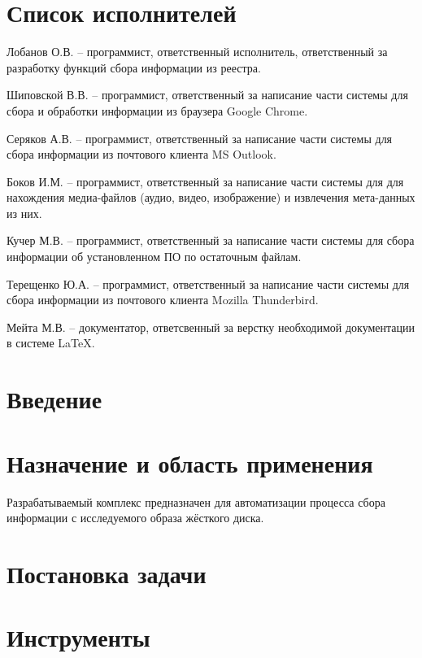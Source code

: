 


 
 
 
 \newpage
 \section*{Список исполнителей}
 
Лобанов О.В. -- программист, ответственный исполнитель, ответственный за разработку функций сбора информации из реестра. 

Шиповской В.В. -- программист, ответственный за написание части системы для сбора и обработки информации из браузера Google Chrome.

Серяков А.В. -- программист, ответственный за написание части системы для сбора информации из почтового клиента MS Outlook.

Боков И.М. -- программист, ответственный за написание части системы для для нахождения медиа-файлов (аудио, видео, изображение) и извлечения мета-данных из них.

Кучер М.В. -- программист, ответственный за написание части системы для сбора информации об установленном ПО по остаточным файлам.

Терещенко Ю.А. -- программист, ответственный за написание части системы для сбора информации из почтового клиента Mozilla Thunderbird.

Мейта М.В. -- документатор, ответсвенный за верстку необходимой документации в системе \LaTeX.

 
 \newpage
 \tableofcontents

 \newpage
 \section*{Введение}
 

 \section{Назначение и область применения}
Разрабатываемый комплекс предназначен для автоматизации процесса сбора информации с исследуемого образа жёсткого диска.
\section{Постановка задачи}
\setcounter{figure}{0}

\section{Инструменты}
\setcounter{figure}{0}
